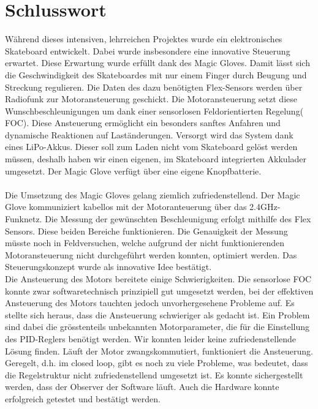 \chapter{Schlusswort}

Während dieses intensiven, lehrreichen Projektes wurde ein elektronisches Skateboard entwickelt. Dabei wurde insbesondere eine innovative Steuerung erwartet. Diese Erwartung wurde erfüllt dank des Magic Gloves. Damit lässt sich die Geschwindigkeit des Skateboardes mit nur einem Finger durch Beugung und Streckung regulieren. Die Daten des dazu benötigten Flex-Sensors werden über Radiofunk zur Motoransteuerung geschickt. Die Motoransteuerung setzt diese Wunschbeschleunigungen um dank einer sensorlosen Feldorientierten Regelung( FOC). Diese Ansteuerung ermöglicht ein besonders sanftes Anfahren und dynamische Reaktionen auf Laständerungen. Versorgt wird das System dank eines LiPo-Akkus. Dieser soll zum Laden nicht vom Skateboard gelöst werden müssen, deshalb haben wir einen eigenen, im Skateboard integrierten Akkulader umgesetzt. Der Magic Glove verfügt über eine eigene Knopfbatterie.\\
\\
Die Umsetzung des Magic Gloves gelang ziemlich zufriedenstellend. Der Magic Glove kommuniziert kabellos mit der Motoranteuerung über das 2.4GHz-Funknetz. Die Messung der gewünschten Beschleunigung erfolgt mithilfe des Flex Sensors. Diese beiden Bereiche funktionieren. Die Genauigkeit der Messung müsste noch in Feldversuchen, welche aufgrund der nicht funktionierenden Motoransteuerung nicht durchgeführt werden konnten, optimiert werden. Das Steuerungskonzept wurde als innovative Idee bestätigt. \\
Die Ansteuerung des Motors bereitete einige Schwierigkeiten. Die sensorlose FOC konnte zwar softwaretechnisch prinzipiell gut umgesetzt werden, bei der effektiven Ansteuerung des Motors tauchten jedoch unvorhergesehene Probleme auf. Es stellte sich heraus, dass die Ansteuerung schwieriger als gedacht ist. Ein Problem sind dabei die grösstenteils unbekannten Motorparameter, die für die Einstellung des PID-Reglers benötigt werden. Wir konnten leider keine zufriedenstellende Lösung finden. Läuft der Motor zwangskommutiert, funktioniert die Ansteuerung. Geregelt, d.h. im closed loop, gibt es noch zu viele Probleme, was bedeutet, dass die Regelstruktur nicht zufriedenstellend umgesetzt ist. Es konnte sichergestellt werden, dass der Observer der Software läuft. Auch die Hardware konnte erfolgreich getestet und bestätigt werden. \\
